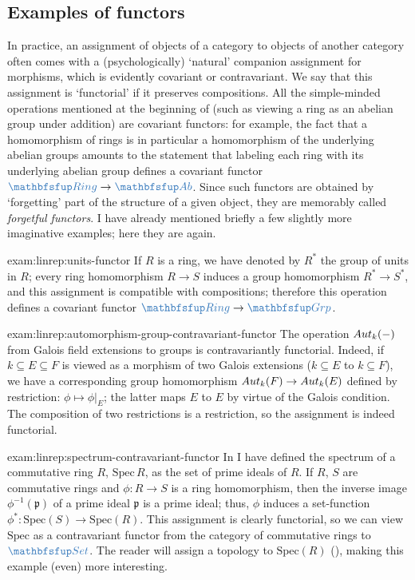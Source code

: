 \subsection{Examples of functors}
\label{subsec:linrep:examples-of-functors}
In practice, an assignment of objects of a category to objects of
another category often comes with a (psychologically) `natural'
companion assignment for morphisms, which is evidently covariant or
contravariant. We say that this assignment is `functorial' if it
preserves compositions. All the simple-minded operations mentioned at
the beginning of  (such as viewing a
ring as an abelian group under addition) are covariant functors: for
example, the fact that a homomorphism of rings is in particular a
homomorphism of the underlying abelian groups amounts to the statement
that labeling each ring with its underlying abelian group defines a
covariant functor $\categ{Ring} \to \categ{Ab}$. Since such functors
are obtained by `forgetting' part of the structure of a given object,
they are memorably called \emph{forgetful functors}. I have already
mentioned briefly a few slightly more imaginative examples; here they
are again.
\begin{exam}{}{exam:linrep:units-functor}
  If $R$ is a ring, we have denoted by $R^\ast$ the group of units in
  $R$; every ring homomorphism $R \to S$ induces a group homomorphism
  $R^\ast \to S^\ast$, and this assignment is compatible with
  compositions; therefore this operation defines a covariant functor
  $\categ{Ring} \to \categ{Grp}$.
\end{exam}
\begin{exam}{}{exam:linrep:automorphism-group-contravariant-functor}
  The operation $Aut_k(-)$ from Galois field extensions to groups is
  contravariantly functorial. Indeed, if $k \subseteq E \subseteq F$
  is viewed as a morphism of two Galois extensions ($k \subseteq E$ to
  $k \subseteq F$), we have a corresponding group homomorphism
  $Aut_k(F) \to Aut_k(E)$ defined by restriction:
  $\phi \mapsto \phi|_E$; the latter maps $E$ to $E$ by virtue of the
  Galois condition. The composition of two restrictions is a
  restriction, so the assignment is indeed functorial.
\end{exam}
\begin{exam}{}{exam:linrep:spectrum-contravariant-functor}
  In  I have defined
  the spectrum of a commutative ring $R$, $\mathrm{Spec}\,R$, as the
  set of prime ideals of $R$. If $R$, $S$ are commutative rings and
  $\phi : R \to S$ is a ring homomorphism, then the inverse image
  $\phi^{-1}(\mathfrak{p})$ of a prime ideal $\mathfrak{p}$ is a prime
  ideal; thus, $\phi$ induces a set-function
  $\phi^\ast : \mathrm{Spec}(S) \to \mathrm{Spec}(R)$. This assignment
  is clearly functorial, so we can view $\mathrm{Spec}$ as a
  contravariant functor from the category of commutative rings to
  $\categ{Set}$. The reader will assign a topology to
  $\mathrm{Spec}(R)$
  (), making this
  example (even) more interesting.
\end{exam}
